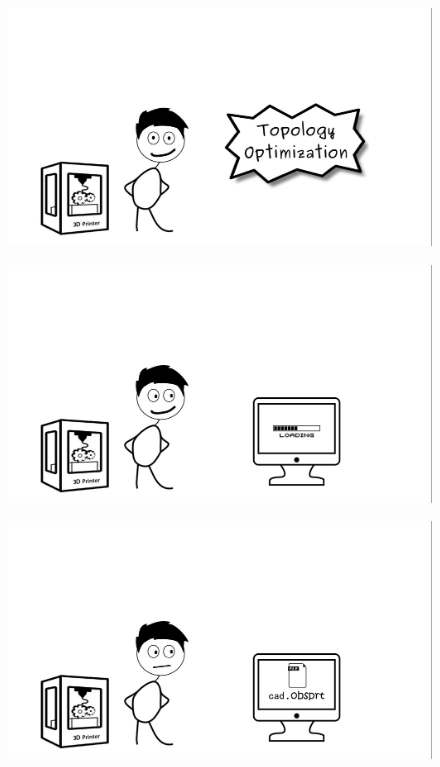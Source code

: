 \begin{frame}
\begin{figure}

\vspace{-.7cm}	
\hspace{-2cm}		\includegraphics[width=1.2\linewidth]{Pictures/animations/animation_7.png}
		\end{figure}

\end{frame}

\begin{frame}
\begin{figure}

\vspace{-.7cm}	
\hspace{-2cm}		\includegraphics[width=1.2\linewidth]{Pictures/animations/animation_8.png}
		\end{figure}

\end{frame}

\begin{frame}
\begin{figure}

\vspace{-.7cm}	
\hspace{-2cm}		\includegraphics[width=1.2\linewidth]{Pictures/animations/animation_9.png}
		\end{figure}

\end{frame}
